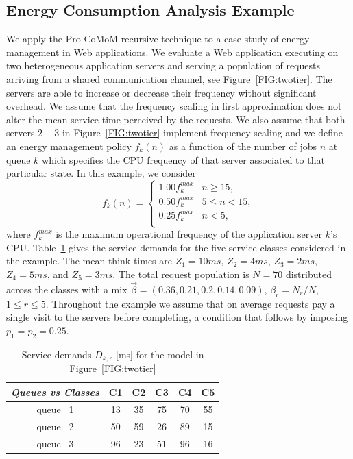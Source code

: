 \documentclass[journal,twocolumn,9.5pt]{IEEEtran}
\begin{document}
\subsection{Energy Consumption Analysis Example}
\label{SEC:perfopt}
We apply the Pro-CoMoM recursive technique to a case study of energy management in Web applications. We evaluate a Web application executing on two heterogeneous application servers and serving a population of requests arriving from a shared communication channel, see Figure~\ref{FIG:twotier}.  The servers are able to increase or decrease their frequency without significant overhead. We assume that the frequency scaling in first approximation does not alter the mean service time perceived by the requests. We also assume that both servers $2-3$ in Figure~\ref{FIG:twotier} implement frequency scaling and we define an energy management policy $f_k(n)$ as a function of the number of jobs $n$ at queue $k$ which specifies the CPU frequency of that server associated to that particular state. In this example, we consider
\begin{equation}
f_k(n)=\begin{cases}
1.00 f^{max}_k & n\geq 15, \\
0.50 f^{max}_k & 5\leq n< 15, \\
0.25 f^{max}_k & n< 5, \\
\end{cases}\nonumber
\end{equation}
where $f^{max}_k$ is the maximum operational frequency of the application server $k$'s CPU.
Table~\ref{TAB:casestudyenergy} gives the service demands for the five service classes considered in the example. The mean think times are $Z_1=10ms$, $Z_2=4ms$, $Z_3=2ms$, $Z_4=5ms$, and $Z_5=3ms$. The total request population is $N=70$ distributed across the classes with a mix $\vec \beta=(0.36,0.21,0.2,0.14,0.09)$, $\beta_r=N_r/N$, $1\leq r\leq 5$. Throughout the example we assume that  on average requests pay a single visit to the servers before completing, a condition that follows by imposing $p_1=p_2=0.25$.
\begin{table}[ht!]
\centering
\caption{Service demands  $D_{k,r}$ [ms] for the model in Figure~\ref{FIG:twotier}}
\label{TAB:casestudyenergy}
\begin{tabular}{|c|cc ccc|}
\hline
\emph{\textrm{Queues} vs {\rm Classes}} & C1 &C2 &C3 &C4 &C5 \\
   \hline
{\rm queue~} 1  &     13  &  35 &   75  &  70 &   55\\
{\rm queue~} 2  &     50  &  59 &   26  &  89 &   15\\
{\rm queue~} 3  &     96  &  23 &   51  &  96 &   16\\
   \hline
\end{tabular}
\end{table}
\end{document}
